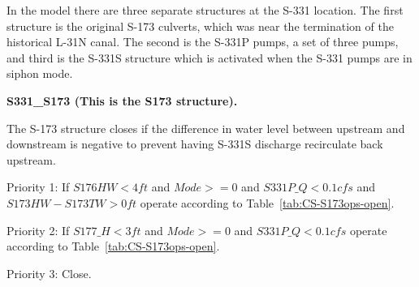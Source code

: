 

In the model there are three separate structures at the S-331 location.
The first structure is the original S-173 culverts, which was near the termination of the historical L-31N canal.
The second is the S-331P pumps, a set of three pumps, and third is the S-331S structure which is activated when the S-331 pumps are in siphon mode.



\textbf{S331\_S173 (This is the S173 structure).}

The S-173 structure closes if the difference in water level between upstream and downstream is negative to prevent having S-331S discharge recirculate back upstream.



\begin{packed_items}
\item Priority 1: If $S176HW < 4 ft$ and $Mode >= 0$ and $S331P\_Q < 0.1 cfs$ and $S173HW-S173TW > 0 ft$ operate according to Table~\ref{tab:CS-S173ops-open}. %
\item Priority 2: If $S177\_H < 3 ft$ and $Mode >= 0$ and $S331P\_Q < 0.1 cfs$ operate according to Table~\ref{tab:CS-S173ops-open}. %
\item Priority 3: Close.
\end{packed_items}

